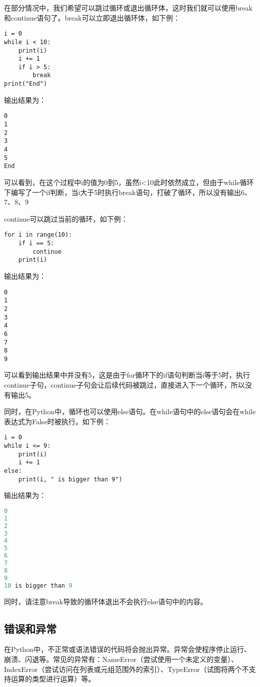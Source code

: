 在部分情况中，我们希望可以跳过循环或退出循环体，这时我们就可以使用break和continue语句了。break可以立即退出循环体，如下例：

\begin{lstlisting}
i = 0
while i < 10:
    print(i)
    i += 1
    if i > 5:
        break
print("End")
\end{lstlisting}

输出结果为：
\begin{lstlisting}
0
1
2
3
4
5
End
\end{lstlisting}

可以看到，在这个过程中i的值为0到5，虽然i<10此时依然成立，但由于while循环下编写了一个if判断，当i大于5时执行break语句，打破了循环，所以没有输出6、7、8、9

continue可以跳过当前的循环，如下例：

\begin{lstlisting}
for i in range(10):
    if i == 5:
        continue
    print(i)
\end{lstlisting}


输出结果为：
\begin{lstlisting}
0
1
2
3
4
6
7
8
9
\end{lstlisting}

可以看到输出结果中并没有5，这是由于for循环下的if语句判断当i等于5时，执行continue子句，continue子句会让后续代码被跳过，直接进入下一个循环，所以没有输出5。

同时，在Python中，循环也可以使用else语句。在while语句中的else语句会在while表达式为False时被执行。如下例：

\begin{lstlisting}
i = 0
while i <= 9:
    print(i)
    i += 1
else:
    print(i, " is bigger than 9")
\end{lstlisting}

输出结果为：
\begin{lstlisting}[language=C]
0
1
2
3
4
5
6
7
8
9
10 is bigger than 9
\end{lstlisting}

同时，请注意break导致的循环体退出不会执行else语句中的内容。

\subsection{错误和异常\PyOnly }
在Python中，不正常或语法错误的代码将会抛出异常。异常会使程序停止运行、崩溃、闪退等。常见的异常有：NameError（尝试使用一个未定义的变量）、IndexError（尝试访问在列表或元组范围外的索引）、TypeError（试图将两个不支持运算的类型进行运算）等。

